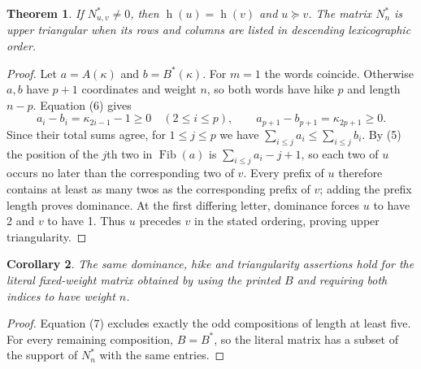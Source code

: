 \documentclass[11pt]{article}
\newtheorem{theorem}{Theorem}
\newtheorem{corollary}[theorem]{Corollary}
\newcommand{\Fib}{\operatorname{Fib}}
\newcommand{\hik}{\operatorname{h}}
\begin{document}
\begin{theorem}\label{thm:dominance}
If $N^*_{u,v}\ne0$, then $\hik(u)=\hik(v)$ and $u\succeq v$.
The matrix $N^*_n$ is upper triangular when its rows and columns are
listed in descending lexicographic order.
\end{theorem}
\begin{proof}
Let $a=A(\kappa)$ and $b=B^*(\kappa)$. For $m=1$ the words coincide.
Otherwise $a,b$ have $p+1$ coordinates and weight $n$, so both words
have hike $p$ and length $n-p$. Equation (6) gives
\[
 a_i-b_i=\kappa_{2i-1}-1\ge0\quad(2\le i\le p),\qquad
 a_{p+1}-b_{p+1}=\kappa_{2p+1}\ge0.
 \tag{8}
\]
Since their total sums agree, for $1\le j\le p$ we have
$\sum_{i\le j}a_i\le\sum_{i\le j}b_i$.
By (5) the position of the $j$th two in $\Fib(a)$ is
$\sum_{i\le j}a_i-j+1$, so each two of $u$ occurs no later than the
corresponding two of $v$. Every prefix of $u$ therefore contains at least
as many twos as the corresponding prefix of $v$; adding the prefix
length proves dominance. At the first differing letter, dominance
forces $u$ to have 2 and $v$ to have 1. Thus $u$ precedes $v$ in the
stated ordering, proving upper triangularity.
\end{proof}

\begin{corollary}\label{cor:literal}
The same dominance, hike and triangularity assertions hold for the
literal fixed-weight matrix obtained by using the printed $B$ and
requiring both indices to have weight $n$.
\end{corollary}
\begin{proof}
Equation (7) excludes exactly the odd compositions of length at least
five. For every remaining composition, $B=B^*$, so the literal matrix
has a subset of the support of $N^*_n$ with the same entries.
\end{proof}
\end{document}
